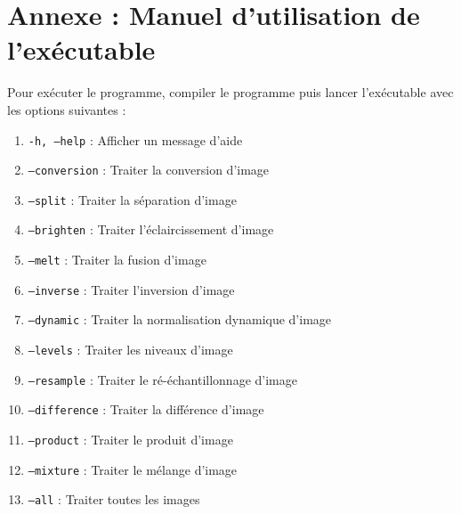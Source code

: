 \documentclass[a4paper,12pt]{article}
\begin{document}
\section*{Annexe : Manuel d'utilisation de l'exécutable}
Pour exécuter le programme, compiler le programme puis lancer l'exécutable avec les options suivantes :
\begin{enumerate}
    \item \texttt{-h, ---help} : Afficher un message d'aide
    \item \texttt{---conversion} : Traiter la conversion d'image
    \item \texttt{---split} : Traiter la séparation d'image
    \item \texttt{---brighten} : Traiter l'éclaircissement d'image
    \item \texttt{---melt} : Traiter la fusion d'image
    \item \texttt{---inverse} : Traiter l'inversion d'image
    \item \texttt{---dynamic} : Traiter la normalisation dynamique d'image
    \item \texttt{---levels} : Traiter les niveaux d'image
    \item \texttt{---resample} : Traiter le ré-échantillonnage d'image
    \item \texttt{---difference} : Traiter la différence d'image
    \item \texttt{---product} : Traiter le produit d'image
    \item \texttt{---mixture} : Traiter le mélange d'image
    \item \texttt{---all} : Traiter toutes les images
\end{enumerate}
\end{document}
